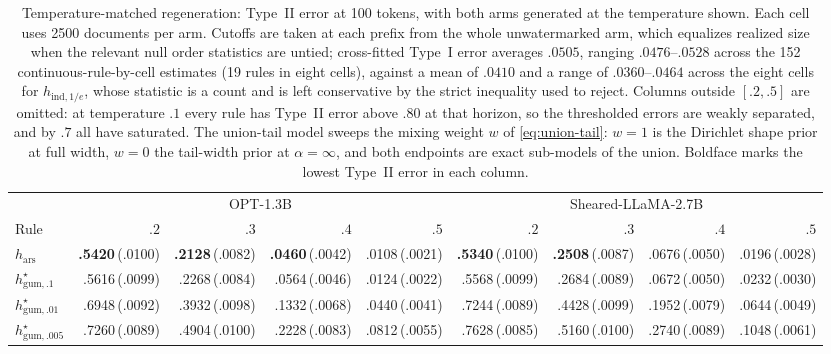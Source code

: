 \documentclass[11pt]{article}
\newcommand{\mcse}[2]{\mbox{#1\,{\fontsize{7}{8}\selectfont(#2)}}}
\newcommand{\bestmcse}[2]{\mbox{\textbf{#1}\,{\fontsize{7}{8}\selectfont(#2)}}}
\begin{document}
\begin{table}[htbp]
\centering
\scriptsize
\setlength{\tabcolsep}{2.2pt}
\caption{Temperature-matched regeneration: Type~II error at 100 tokens, with both arms generated at the temperature shown.  Each cell uses 2500 documents per arm.  Cutoffs are taken at each prefix from the whole unwatermarked arm, which equalizes realized size when the relevant null order statistics are untied; cross-fitted Type~I error averages $.0505$, ranging $.0476$--$.0528$ across the 152 continuous-rule-by-cell estimates (19 rules in eight cells), against a mean of $.0410$ and a range of $.0360$--$.0464$ across the eight cells for $h_{\mathrm{ind},1/e}$, whose statistic is a count and is left conservative by the strict inequality used to reject.  Columns outside $[.2,.5]$ are omitted: at temperature $.1$ every rule has Type~II error above $.80$ at that horizon, so the thresholded errors are weakly separated, and by $.7$ all have saturated.  The union-tail model sweeps the mixing weight $w$ of \eqref{eq:union-tail}: $w=1$ is the Dirichlet shape prior at full width, $w=0$ the tail-width prior at $\alpha=\infty$, and both endpoints are exact sub-models of the union.  Boldface marks the lowest Type~II error in each column.}
\label{tab:temperature-matched}
\begin{tabular}{@{}lrrrrrrrr@{}}
\toprule
& \multicolumn{4}{c}{OPT-1.3B} & \multicolumn{4}{c}{Sheared-LLaMA-2.7B} \\
\cmidrule(lr){2-5}\cmidrule(lr){6-9}
Rule & $.2$ & $.3$ & $.4$ & $.5$ & $.2$ & $.3$ & $.4$ & $.5$ \\
\midrule
$h_{\mathrm{ars}}$ & \bestmcse{.5420}{.0100} & \bestmcse{.2128}{.0082} & \bestmcse{.0460}{.0042} & \mcse{.0108}{.0021} & \bestmcse{.5340}{.0100} & \bestmcse{.2508}{.0087} & \mcse{.0676}{.0050} & \mcse{.0196}{.0028} \\
$h^\star_{\mathrm{gum},.1}$ & \mcse{.5616}{.0099} & \mcse{.2268}{.0084} & \mcse{.0564}{.0046} & \mcse{.0124}{.0022} & \mcse{.5568}{.0099} & \mcse{.2684}{.0089} & \mcse{.0672}{.0050} & \mcse{.0232}{.0030} \\
$h^\star_{\mathrm{gum},.01}$ & \mcse{.6948}{.0092} & \mcse{.3932}{.0098} & \mcse{.1332}{.0068} & \mcse{.0440}{.0041} & \mcse{.7244}{.0089} & \mcse{.4428}{.0099} & \mcse{.1952}{.0079} & \mcse{.0644}{.0049} \\
$h^\star_{\mathrm{gum},.005}$ & \mcse{.7260}{.0089} & \mcse{.4904}{.0100} & \mcse{.2228}{.0083} & \mcse{.0812}{.0055} & \mcse{.7628}{.0085} & \mcse{.5160}{.0100} & \mcse{.2740}{.0089} & \mcse{.1048}{.0061} \\

\end{tabular}
\end{table}
\end{document}
